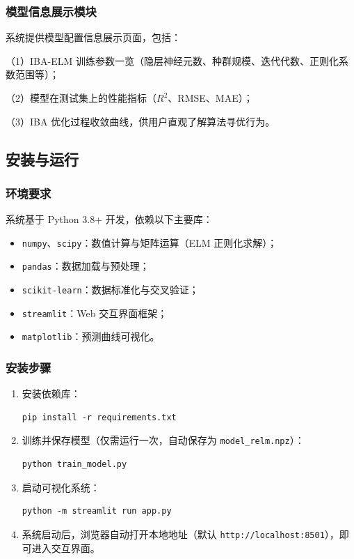 \documentclass[11pt]{article}
\begin{document}
\subsubsection{模型信息展示模块}
\label{subsec:model_info}

系统提供模型配置信息展示页面，包括：

（1）IBA-ELM 训练参数一览（隐层神经元数、种群规模、迭代代数、正则化系数范围等）；

（2）模型在测试集上的性能指标（$R^2$、RMSE、MAE）；

（3）IBA 优化过程收敛曲线，供用户直观了解算法寻优行为。

\subsection{安装与运行}
\label{sec:sys_install}

\subsubsection{环境要求}

系统基于 Python 3.8+ 开发，依赖以下主要库：

\begin{itemize}
\item \texttt{numpy}、\texttt{scipy}：数值计算与矩阵运算（ELM 正则化求解）；
\item \texttt{pandas}：数据加载与预处理；
\item \texttt{scikit-learn}：数据标准化与交叉验证；
\item \texttt{streamlit}：Web 交互界面框架；
\item \texttt{matplotlib}：预测曲线可视化。
\end{itemize}

\subsubsection{安装步骤}

\begin{enumerate}
  \item 安装依赖库：
\begin{verbatim}
pip install -r requirements.txt
\end{verbatim}

  \item 训练并保存模型（仅需运行一次，自动保存为 \texttt{model\_relm.npz}）：
\begin{verbatim}
python train_model.py
\end{verbatim}

  \item 启动可视化系统：
\begin{verbatim}
python -m streamlit run app.py
\end{verbatim}

  \item 系统启动后，浏览器自动打开本地地址（默认 \texttt{http://localhost:8501}），即可进入交互界面。
\end{enumerate}
\end{document}
